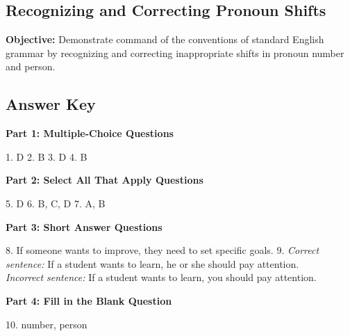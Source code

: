 \documentclass[12pt]{article}
\begin{document}
\subsection*{Recognizing and Correcting Pronoun Shifts}
\onehalfspacing

\begin{tcolorbox}[colframe=black!40, colback=gray!0, title=Learning Objective]
\textbf{Objective:} Demonstrate command of the conventions of standard English grammar by recognizing and correcting inappropriate shifts in pronoun number and person.
\end{tcolorbox}

\subsection*{Answer Key}

\textbf{Part 1: Multiple-Choice Questions}

1. D  
2. B  
3. D  
4. B  

\textbf{Part 2: Select All That Apply Questions}

5. D  
6. B, C, D  
7. A, B  

\textbf{Part 3: Short Answer Questions}

8. If someone wants to improve, they need to set specific goals.  
9. \textit{Correct sentence:} If a student wants to learn, he or she should pay attention.  \\ \textit{Incorrect sentence:} If a student wants to learn, you should pay attention.  

\textbf{Part 4: Fill in the Blank Question}

10. number, person
\end{document}

